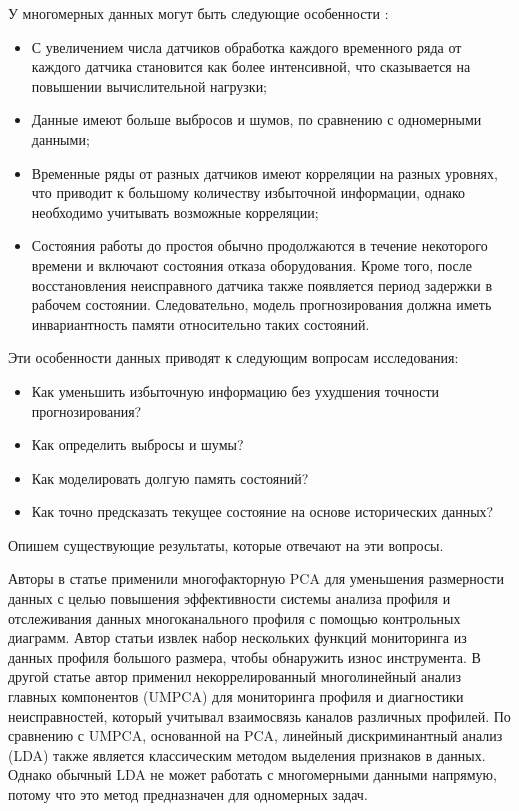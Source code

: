 У многомерных данных могут быть следующие особенности \cite{wei-series}: 
\begin{itemize}
    \item С увеличением числа датчиков обработка каждого 
    временного ряда от каждого датчика становится как более интенсивной, что сказывается на повышении вычислительной нагрузки;
    \item Данные имеют больше выбросов и шумов, по сравнению с одномерными данными;
    \item Временные ряды от разных датчиков имеют корреляции на разных уровнях, 
    что приводит к большому количеству избыточной информации, однако необходимо учитывать возможные корреляции;
    \item Состояния работы до простоя обычно продолжаются в течение некоторого времени и включают состояния отказа оборудования. 
    Кроме того, после восстановления неисправного датчика также появляется период задержки в рабочем состоянии. 
    Следовательно, модель прогнозирования должна иметь инвариантность памяти относительно таких состояний. 
\end{itemize}


Эти особенности данных приводят к следующим вопросам исследования:

\begin{itemize}
    \item Как уменьшить избыточную информацию без ухудшения точности прогнозирования?
    \item Как определить выбросы и шумы?
    \item Как моделировать долгую память состояний?
    \item Как точно предсказать текущее состояние на основе исторических данных?
\end{itemize}

Опишем существующие результаты, которые отвечают на эти вопросы.

Авторы в статье \cite{4-13}
применили многофакторную PCA для уменьшения размерности данных с целью повышения эффективности системы анализа 
профиля и отслеживания данных многоканального профиля с помощью контрольных диаграмм. 
Автор статьи \cite{4-14} извлек набор нескольких функций мониторинга из данных профиля большого размера, 
чтобы обнаружить износ инструмента. 
В другой статье \cite{4-15} автор применил некоррелированный многолинейный анализ главных компонентов (UMPCA) \cite{4-16}
для мониторинга профиля и диагностики неисправностей, который учитывал взаимосвязь каналов различных профилей. 
По сравнению с UMPCA, основанной на PCA, линейный дискриминантный анализ (LDA) 
также является классическим методом выделения признаков в данных. 
Однако обычный LDA не может работать с многомерными данными напрямую, потому что это метод предназначен для одномерных задач. 

